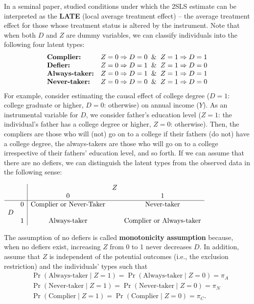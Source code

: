 \documentclass[11pt, A4paper, openany, uplatex]{book}
\begin{document}
In a seminal paper, \cite{imbens1994identification} studied conditions under which the 2SLS estimate can be interpreted as the \textbf{LATE} (local average treatment effect) -- the average treatment effect for those whose treatment status is altered by the instrument. 
Note that when both $D$ and $Z$ are dummy variables, we can classify individuals into the following four latent types:
\[
\begin{array}{ll}
	\text{\bf Complier:} & Z = 0 \Rightarrow D = 0 \;\; \& \;\; Z = 1 \Rightarrow D = 1 \\
	\text{\bf Defier:}   & Z = 0 \Rightarrow D = 1 \;\; \& \;\; Z = 1 \Rightarrow D = 0 \\
	\text{\bf Always-taker:} & Z = 0 \Rightarrow D = 1 \;\; \& \;\; Z = 1 \Rightarrow D = 1 \\
	\text{\bf Never-taker:}  & Z = 0 \Rightarrow D = 0 \;\; \& \;\; Z = 1 \Rightarrow D = 0 
\end{array}
\]
For example, consider estimating the causal effect of college degree ($D = 1$: college graduate or higher, $D = 0$: otherwise) on annual income ($Y$).
As an instrumental variable for $D$, we consider father's education level ($Z = 1$: the individual's father has a college degree or higher, $Z = 0$: otherwise).
Then, the compliers are those who will (not) go on to a college if their fathers (do not) have a college degree, the always-takers are those who will go on to a college irrespective of their fathers' education level, and so forth.
If we can assume that there are no defiers, we can distinguish the latent types from the observed data in the following sense: 
\begin{center}
	$
	\begin{array}
	[c]{cc|ccc}
	&  &  & Z & \\
	&  & 0 &  & 1\\\hline
	& 0 & \text{Complier or Never-Taker} &  & \text{Never-taker}\\
	D &  &  &  & \\
	& 1 & \text{Always-taker} &  & \text{Complier or Always-taker}
	\end{array}
	$
\end{center}
The assumption of no defiers is called \textbf{monotonicity assumption} because, when no defiers exist, increasing $Z$ from 0 to 1 never decreases $D$.
In addition, assume that $Z$ is independent of the potential outcomes (i.e., the exclusion restriction) and the individuals' types such that
\begin{align*}
	& \Pr(\text{Always-taker} \mid Z = 1) = \Pr(\text{Always-taker} \mid Z = 0) = \pi_A\\
	& \Pr(\text{Never-taker} \mid Z = 1) = \Pr(\text{Never-taker} \mid Z = 0) = \pi_N\\
	& \Pr(\text{Complier} \mid Z = 1) = \Pr(\text{Complier} \mid Z = 0) = \pi_C.
\end{align*}
\end{document}
